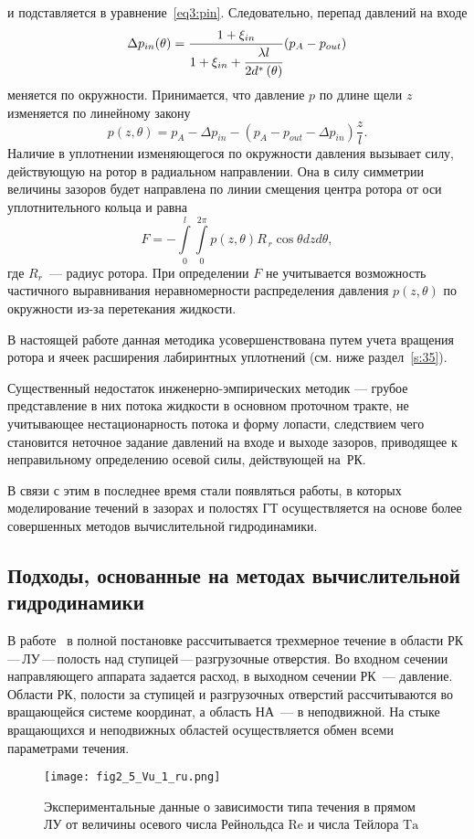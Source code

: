 и подставляется в уравнение~\eqref{eq3:pin}. Следовательно, перепад давлений на входе
\begin{equation*}
  \Delta p_{in}(\theta) = \frac{1+\xi_{in}}{1+\xi_{in}+\cfrac{\lambda l}{2d^* 
                \left(\theta \right)}}(p_A -p_{out})
\end{equation*}
меняется по окружности. Принимается, что давление $p$ по длине щели $z$ изменяется по линейному закону
\begin{equation*}
  p(z,\theta) = p_A - \Delta p_{in} - \left(p_A -p_{out}-\Delta p_{in} \right)\frac{z}{l}.
\end{equation*}
Наличие в уплотнении изменяющегося по окружности давления вызывает силу, действующую на 
ротор в радиальном направлении. Она в силу симметрии величины зазоров будет направлена по линии смещения 
центра ротора от оси уплотнительного кольца и равна
\begin{equation*}
  F = -\int\limits_0^l {\int\limits_0^{2\pi } {p\left( {z,\theta } \right)R_{\,r} \cos \theta } } dzd\theta,
\end{equation*}
где $R_r$~--- радиус ротора. При определении $F$ не учитывается возможность частичного 
выравнивания неравномерности распределения давления $p(z,\theta)$ по окружности из-за перетекания жидкости.

В настоящей работе данная методика усовершенствована путем учета вращения ротора и ячеек 
расширения лабиринтных уплотнений (см. ниже раздел~\ref{s:35}).

Существенный недостаток инженерно-эмпирических методик --- грубое представление в них потока жидкости в 
основном проточном тракте, не учитывающее нестационарность потока и форму лопасти, следствием чего становится 
неточное задание давлений на входе и выходе зазоров, приводящее к неправильному определению осевой силы, 
действующей на~РК.

В связи с этим в последнее время стали появляться работы, в которых моделирование течений в зазорах и полостях 
ГТ осуществляется на основе более совершенных методов вычислительной гидродинамики.

\subsection{Подходы, основанные на методах вычислительной гидродинамики}
\label{s:323}
В работе~\cite{staubli} в полной постановке рассчитывается трехмерное течение в 
области РК\,---\,ЛУ\,---\,по\-лос\-ть над ступицей\,---\,разгрузочные отверстия. Во входном сечении направляющего аппарата задается расход, в выходном сечении РК~--- давление. 
Области РК, полости за ступицей и разгрузочных отверстий рассчитываются во вращающейся системе координат, 
а область НА~--- в неподвижной. На стыке вращающихся и неподвижных областей осуществляется обмен всеми 
параметрами течения.
\begin{figure}[b!]
  \centering
  \texttt{[image: fig2\_5\_Vu\_1\_ru.png]}
  \caption{Экспериментальные данные о зависимости типа течения в  прямом ЛУ от величины осевого числа 
  Рейнольдса $\mathrm{Re}$ и числа Тейлора $\mathrm{Ta}$~\cite{roy_vu}}
  \label{fig3:2.5}
\end{figure}

